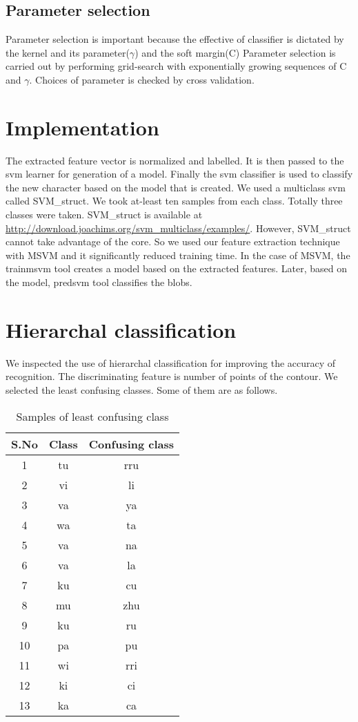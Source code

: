 \subsection{Parameter selection} 
Parameter selection is important because the effective of classifier is dictated by the kernel and 
its parameter($\gamma$) and the soft margin(C)
Parameter selection is carried out by performing grid-search with exponentially growing sequences of C and $\gamma$. Choices of parameter is checked by cross validation.
\section{Implementation}
The extracted feature vector is normalized and labelled. It is then passed to the svm learner for generation of a model.
Finally the svm classifier is used to classify the new character based on the model that is created. 
We used a multiclass svm called SVM\_struct.
We took at-least ten samples from each class. Totally three classes were taken. SVM\_struct is available at \url{http://download.joachims.org/svm_multiclass/examples/}.
However, SVM\_struct cannot take advantage of the core. 
So we used our feature 
extraction technique with MSVM\cite{lauer} and it significantly reduced training time.
In the case of MSVM, the trainmsvm tool creates a model based on the extracted features. Later, based on the model, predsvm tool classifies the blobs.
\section{Hierarchal classification}
We inspected the use of hierarchal classification for improving the accuracy of recognition. 
The discriminating feature is number of points of the contour. We selected the least confusing classes.
Some of them are as follows.

\begin{table}[!t]\center
  \begin{tabular}{ccc}
\toprule
 \textbf{S.No} & \textbf{Class}  & \textbf{Confusing class}  \\
\midrule
1 &     tu & rru \\  
2 &     vi & li \\  
3 &     va & ya \\  
4 &     wa & ta \\  
5 &     va & na \\  
6 &     va & la \\  
7 &     ku & cu \\  
8 &     mu & zhu \\  
9 &     ku & ru \\  
10 &    pa & pu \\  
11 &    wi & rri \\  
12 &    ki & ci \\  
13 &    ka & ca \\  
\bottomrule
\end{tabular}
  \caption{Samples of least confusing class}\label{LCONF}
  \end{table}
  

